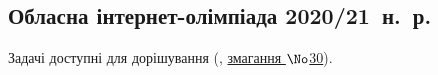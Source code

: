 
\subsection{Обласна інтернет-олімпіада 2020/21~н.~р.}
\renewenvironment{problemAllDefault}[1]{\vspace{10mm}\par\begin{problem}{#1}{\stdinOrInputTxt}{\stdoutOrOutputTxt}{1 сек}{256 мегабайтів}}{\end{problem}}

Задачі доступні для дорішування (\EjudgeCkipoName, \href{https://ejudge.ckipo.edu.ua/cgi-bin/new-register?contest_id=30}{змагання $\No$30}).



	

	

	
